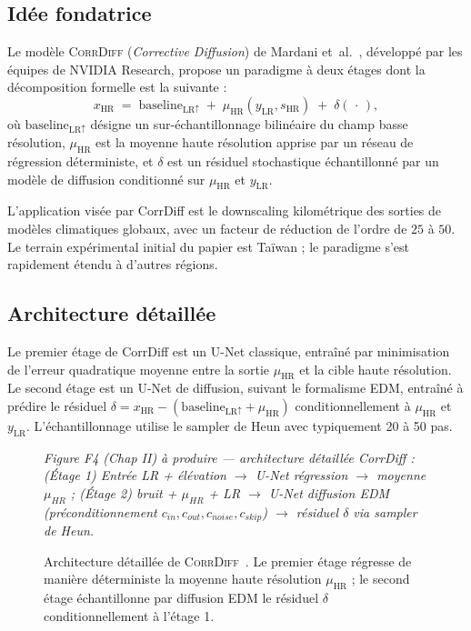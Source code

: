 \documentclass[14pt,a4paper,openany]{extreport}
\theoremstyle{definition}
\newcommand{\CorrDiff}{\textsc{CorrDiff}}
\newcommand{\LR}{\ensuremath{\text{LR}}}
\newcommand{\HR}{\ensuremath{\text{HR}}}
\newcommand{\xHR}{\ensuremath{x_{\HR}}}
\newcommand{\yLR}{\ensuremath{y_{\LR}}}
\newcommand{\muHR}{\ensuremath{\mu_{\HR}}}
\newcommand{\figplaceholder}[2][0.9\linewidth]{%
  \begin{tcolorbox}[width=#1,height=5cm,valign=center,colback=gray!8,colframe=gray!45,arc=2pt,boxrule=0.5pt]
    \centering\small\textit{#2}
  \end{tcolorbox}%
}
\begin{document}
\subsection{Idée fondatrice}
\label{ssec:soa-corrdiff-idee}

Le modèle \CorrDiff{} (\emph{Corrective Diffusion}) de Mardani et~al.~\cite{mardani_corrdiff_2023}, développé par les équipes de NVIDIA Research, propose un paradigme à deux étages dont la décomposition formelle est la suivante :
\begin{equation}
  \xHR \;=\; \mathrm{baseline}_{\LR \uparrow} \;+\; \muHR\!\left(\yLR, s_{\HR}\right) \;+\; \delta\!\left(\,\cdot\,\right),
  \label{eq:corrdiff}
\end{equation}
où $\mathrm{baseline}_{\LR \uparrow}$ désigne un sur-échantillonnage bilinéaire du champ basse résolution, $\muHR$ est la moyenne haute résolution apprise par un réseau de régression déterministe, et $\delta$ est un résiduel stochastique échantillonné par un modèle de diffusion conditionné sur $\muHR$ et $\yLR$.

L'application visée par CorrDiff est le downscaling kilométrique des sorties de modèles climatiques globaux, avec un facteur de réduction de l'ordre de $25$ à $50$. Le terrain expérimental initial du papier est Taïwan ; le paradigme s'est rapidement étendu à d'autres régions.

\subsection{Architecture détaillée}
\label{ssec:soa-corrdiff-archi}

Le premier étage de CorrDiff est un U-Net classique, entraîné par minimisation de l'erreur quadratique moyenne entre la sortie $\muHR$ et la cible haute résolution. Le second étage est un U-Net de diffusion, suivant le formalisme EDM, entraîné à prédire le résiduel $\delta = \xHR - (\mathrm{baseline}_{\LR \uparrow} + \muHR)$ conditionnellement à $\muHR$ et $\yLR$. L'échantillonnage utilise le sampler de Heun avec typiquement 20 à 50 pas.

\begin{figure}[ht]
  \centering
  \figplaceholder{Figure F4 (Chap II) à produire --- architecture détaillée CorrDiff : (Étage 1) Entrée LR + élévation $\to$ U-Net régression $\to$ moyenne $\mu_{HR}$ ; (Étage 2) bruit + $\mu_{HR}$ + LR $\to$ U-Net diffusion EDM (préconditionnement $c_{in}, c_{out}, c_{noise}, c_{skip}$) $\to$ résiduel $\delta$ via sampler de Heun.}
  \caption{Architecture détaillée de \CorrDiff{}~\cite{mardani_corrdiff_2023}. Le premier étage régresse de manière déterministe la moyenne haute résolution $\muHR$ ; le second étage échantillonne par diffusion EDM le résiduel $\delta$ conditionnellement à l'étage 1.}
  \label{fig:corrdiff-archi}
\end{figure}
\end{document}
